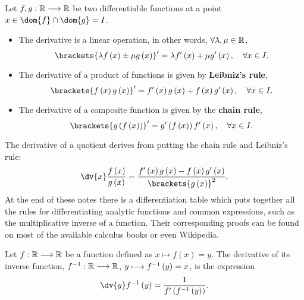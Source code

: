 \begin{prop}
    Let $f, g : \mathbb{R}\longrightarrow \mathbb{R}$ be two differentiable functions at a point $x\in\dom{f}\cap\dom{g} = I$.
    \begin{itemize}[itemsep = -2pt]
        \item The derivative is a linear operation, in other words, $\forall\lambda, \mu\in\mathbb{R}$,
            \begin{equation}
                \brackets{\lambda f\left( x \right) \pm \mu g\left( x \right) }' = \lambda f'\left( x \right) +
                \mu g'\left( x \right), \quad \forall x\in I.
            \end{equation}
        \item The derivative of a product of functions is given by \textbf{Leibniz's rule},
            \begin{equation}
                \brackets{f\left( x \right)g\left( x \right) }' = f'\left( x \right) g\left( x \right) +
                f\left( x \right) g'\left( x \right),\quad \forall x\in I.
            \end{equation}
        \item The derivative of a composite function is given by the \textbf{chain rule},
            \begin{equation}
                \brackets{g\left( f\left( x \right)  \right) }' = g'\left( f\left( x \right)  \right) f'\left( x \right),\quad\forall x\in I.
            \end{equation}
    \end{itemize}
\end{prop}

\noindent The derivative of a quotient derives from putting the chain rule and Leibniz's rule:
\begin{equation}
    \dv{x} \frac{f\left( x \right) }{g\left( x \right) } = \frac{f'\left( x \right) g\left( x \right) -
    f\left( x \right) g'\left( x \right) }{\brackets{g\left( x \right) }^2}.
\end{equation}
At the end of these notes there is a differentiation table which puts together all the rules for differentiating analytic functions and common expressions, such as the multiplicative inverse of a function. Their
corresponding proofs can be found on most of the available calculus books or even Wikipedia.

\begin{prop}\label{prop:deriv-invers-fn}
    Let $f : \mathbb{R}\longrightarrow \mathbb{R}$ be a function defined as $x\longmapsto f\left( x \right) = y$. The derivative
    of its inverse function, $f ^{-1} : \mathbb{R}\longrightarrow \mathbb{R}$, $y\longmapsto f ^{-1}\left( y \right) = x$, is
    the expression
    \begin{equation}
        \dv{y}\invers{f}\left( y \right) = \frac{1}{f'\left( \invers{f}\left( y \right) \right) }.
    \end{equation}
\end{prop}

